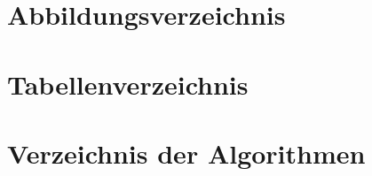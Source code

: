 \cleardoublepage


\chapter{Abbildungsverzeichnis}
\vspace{-0.3cm}
\makeatletter
{}%
\makeatother
\cleardoublepage

	
	
\chapter{Tabellenverzeichnis}
\makeatletter
{}%
\makeatother
\clearpage


\chapter{Verzeichnis der Algorithmen}
\begingroup
\renewcommand{\listalgorithmname}{}
\let\chapter\subsection%
\listofalgorithms
\endgroup
